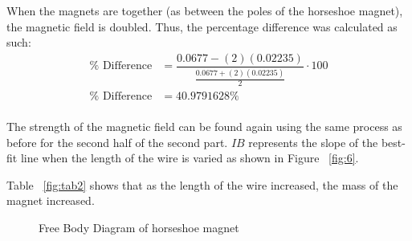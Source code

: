 \documentclass [12pt, letterpaper, twoside] {article}
\begin{document}
\noindent
When the magnets are together (as between the poles of the horseshoe magnet), the magnetic field is doubled. Thus, the percentage difference was calculated as such:
\begin{equation*}
  \begin{split}
    \%\text{ Difference} &= \dfrac{0.0677 - (2)(0.02235)}{\tfrac{0.0677 + (2)(0.02235)}{2}}\cdot{100} \\
    \%\text{ Difference} &= 40.9791628\% \\
  \end{split}
\end{equation*}

\noindent
The strength of the magnetic field can be found again using the same process as before for the second half of the second part. \(IB\) represents the slope of the best-fit line when the length of the wire is varied as shown in Figure ~\ref{fig:6}.

\noindent
Table ~\ref{fig:tab2} shows that as the length of the wire increased, the mass of the magnet increased. 

\begin{figure}
  \centering
  \caption{Free Body Diagram of horseshoe magnet}
  \label{fig:4}
\end{figure}

\currentForce

\begin {figure}                                                             
  \centering
  \caption {}
  \label{fig:5}
\end {figure}
\end{document}
